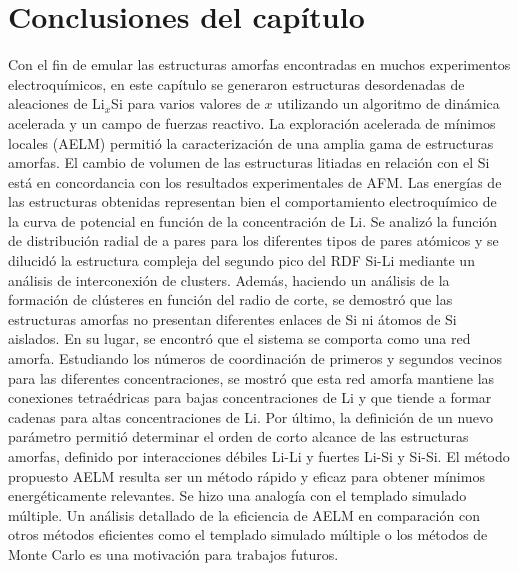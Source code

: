 \section{Conclusiones del capítulo}

Con el fin de emular las estructuras amorfas encontradas en muchos experimentos 
electroquímicos, en este capítulo se generaron estructuras desordenadas de 
aleaciones de Li$_x$Si para varios valores de $x$ utilizando un algoritmo de 
dinámica acelerada y un campo de fuerzas reactivo. La exploración acelerada de 
mínimos locales (AELM) permitió la caracterización de una amplia gama de 
estructuras amorfas. El cambio de volumen de las estructuras litiadas en relación 
con el Si está en concordancia con los resultados experimentales de AFM. Las
energías de las estructuras obtenidas representan bien el comportamiento 
electroquímico de la curva de potencial en función de la concentración de Li. Se 
analizó la función de distribución radial de a pares para los diferentes tipos de 
pares atómicos y se dilucidó la estructura compleja del segundo pico del RDF 
Si-Li mediante un análisis de interconexión de clusters. Además, haciendo un 
análisis de la formación de clústeres en función del radio de corte, se demostró 
que las estructuras amorfas no presentan diferentes enlaces de Si ni átomos de Si 
aislados. En su lugar, se encontró que el sistema se comporta como una red amorfa. 
Estudiando los números de coordinación de primeros y segundos vecinos para las 
diferentes concentraciones, se mostró que esta red amorfa mantiene las conexiones 
tetraédricas para bajas concentraciones de Li y que tiende a formar cadenas para 
altas concentraciones de Li. Por último, la definición de un nuevo parámetro 
permitió determinar el orden de corto alcance de las estructuras amorfas, definido 
por interacciones débiles Li-Li y fuertes Li-Si y Si-Si. El método propuesto AELM 
resulta ser un método rápido y eficaz para obtener mínimos energéticamente 
relevantes. Se hizo una analogía con el templado simulado múltiple. Un análisis 
detallado de la eficiencia de AELM en comparación con otros métodos eficientes 
como el templado simulado múltiple o los métodos de Monte Carlo es una motivación 
para trabajos futuros.